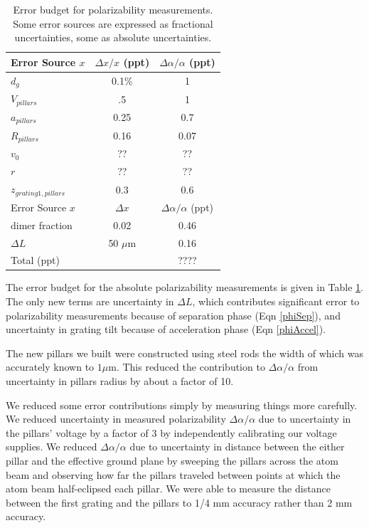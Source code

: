 \documentclass[twocolumn, prl,showpacs,superscriptaddress]{revtex4-1}   %
\newcommand{\eqnref}[1]{Eqn \ref{#1}}
\begin{document}
\begingroup
\begin{table}
\caption{\label{tablePolError}Error budget for polarizability measurements. Some error sources are expressed as fractional uncertainties, some as absolute uncertainties.}
\begin{center}
\begin{tabular}{l c c}
\hline\hline
Error Source $x$ & $\Delta x/x$ (ppt) & $\Delta\alpha/\alpha$ (ppt) \\
\hline
$d_g$ & 0.1\% & 1 \\
$V_{pillars}$ & .5 & 1 \\
$a_{pillars}$ & 0.25 & 0.7 \\
$R_{pillars}$ & 0.16 & 0.07 \\
$v_0$ & ?? & ?? \\
$r$ & ?? & ?? \\
$z_{grating 1,pillars}$ & 0.3 & 0.6 \\
\hline
Error Source $x$ & $\Delta x$ & $\Delta\alpha/\alpha$ (ppt) \\
\hline
dimer fraction & 0.02 & 0.46 \\
$\Delta L$ & 50 $\mu$m & 0.16 \\
\hline
Total (ppt) & & ???? \\
\hline\hline
\end{tabular}
\end{center}
\end{table}
\endgroup

The error budget for the absolute polarizability measurements is given in Table \ref{tablePolError}. The only new terms are uncertainty in $\Delta L$, which contributes significant error to polarizability measurements because of separation phase (\eqnref{phiSep}), and uncertainty in grating tilt because of acceleration phase (\eqnref{phiAccel}).

The new pillars we built were constructed using steel rods the width of which was accurately known to $1 \mu \text{m}$. This reduced the contribution to $\Delta\alpha/\alpha$ from uncertainty in pillars radius by about a factor of 10.

We reduced some error contributions simply by measuring things more carefully. We reduced uncertainty in measured polarizability $\Delta\alpha/\alpha$ due to uncertainty in the pillars' voltage by a factor of 3 by independently calibrating our voltage supplies. We reduced $\Delta\alpha/\alpha$ due to uncertainty in distance between the either pillar and the effective ground plane by sweeping the pillars across the atom beam and observing how far the pillars traveled between points at which the atom beam half-eclipsed each pillar. We were able to measure the distance between the first grating and the pillars to 1/4 mm accuracy rather than 2 mm accuracy. 
\end{document}
